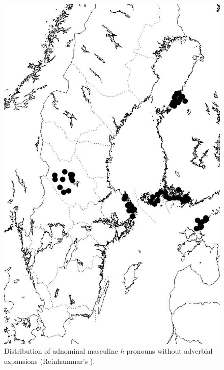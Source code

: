 \begin{figure} 
\includegraphics[height=.5\textheight]{figures/27_Adnominalmasculine}
\caption{Distribution of adnominal masculine \textit{h-}pronouns without adverbial expansions (Reinhammar’s ).}
\label{map:23}
\end{figure}

